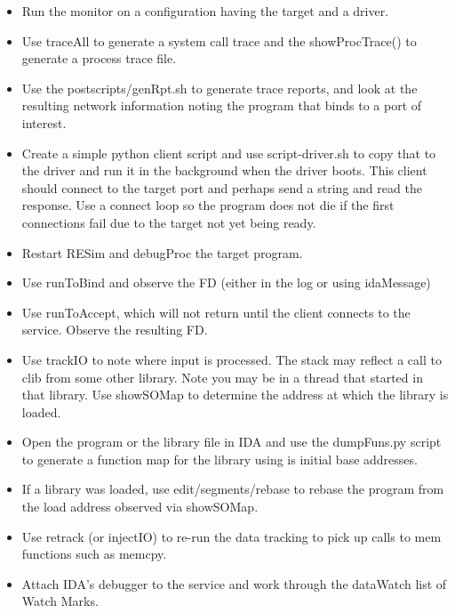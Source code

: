 \documentclass[titlepage]{article}
\begin{document}
\begin{itemize}
\item Run the monitor on a configuration having the target and a driver.

\item Use traceAll to generate a system call trace and the showProcTrace() to generate
a process trace file.

\item Use the postscripts/genRpt.sh to generate trace reports,
and look at the resulting network information noting the
program that binds to a port of interest.

\item Create a simple python client script and use
script-driver.sh to copy that to the driver and
run it in the background when the driver boots.
This client should connect to the target port
and perhaps send a string and read the response.
Use a connect loop so the program does not die if the
first connections fail due to the target not yet being ready.

\item Restart RESim and debugProc the target program.

\item Use runToBind and observe the FD (either in the log
or using idaMessage)

\item Use runToAccept, which will not return until the client
connects to the service.  Observe the resulting FD.

\item Use trackIO to note where input is processed.  The stack
may reflect a call to clib from some other library.  Note
you may be in a thread that started in that library.  Use
showSOMap to determine the address at which
the library is loaded.

\item Open the program or the library file in IDA and use the dumpFuns.py script to
generate a function map for the library using is initial base
addresses.

\item If a library was loaded, use edit/segments/rebase to rebase the program from the load address
observed via showSOMap.

\item Use retrack (or injectIO) to re-run the data tracking to pick up calls to mem functions such as memcpy.

\item Attach IDA's debugger to the service and work through the dataWatch list of Watch Marks.


\end{itemize}
\end{document}
